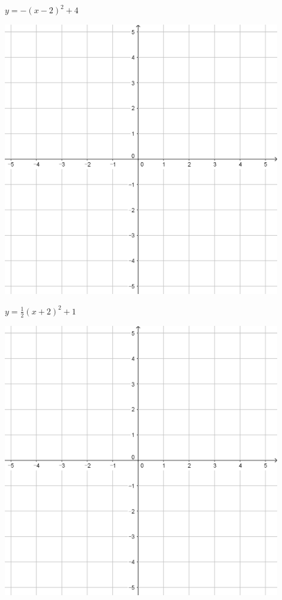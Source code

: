 \documentclass[a4paper]{oblivoir}
\begin{document}
\begin{minipage}{0.45\textwidth}\centering
\(y=-(x-2)^2+4\)
\par\bigskip\includegraphics[width=0.9\textwidth]{55}
\end{minipage}
\begin{minipage}{0.45\textwidth}\centering
\(y=\frac12(x+2)^2+1\)
\par\bigskip\includegraphics[width=0.9\textwidth]{55}
\end{minipage}\bigskip\bigskip\par
\end{document}
